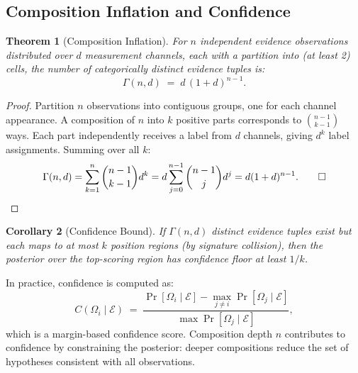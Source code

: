 \documentclass[twocolumn,10pt]{article}
\newtheorem{theorem}{Theorem}[section]
\newtheorem{corollary}[theorem]{Corollary}
\begin{document}
\subsection{Composition Inflation and Confidence}

\begin{theorem}[Composition Inflation]
\label{thm:inflation}
For $n$ independent evidence observations distributed over $d$ measurement
channels, each with a partition into (at least 2) cells, the number of
categorically distinct evidence tuples is:
\begin{equation}
  \Gamma(n, d) \;=\; d\,(1+d)^{n-1}.
  \label{eq:inflation}
\end{equation}
\end{theorem}

\begin{proof}
Partition $n$ observations into contiguous groups, one for each channel
appearance. A composition of $n$ into $k$ positive parts corresponds to
$\binom{n-1}{k-1}$ ways. Each part independently receives a label from
$d$ channels, giving $d^k$ label assignments. Summing over all $k$:
\begin{equation}
  \Gamma(n,d) = \sum_{k=1}^{n} \binom{n-1}{k-1} d^k
  = d \sum_{j=0}^{n-1} \binom{n-1}{j} d^j
  = d(1+d)^{n-1}. \qed
\end{equation}
\end{proof}

\begin{corollary}[Confidence Bound]
\label{cor:conf-bound}
If $\Gamma(n,d)$ distinct evidence tuples exist but each maps to at most
$k$ position regions (by signature collision), then the posterior over
the top-scoring region has confidence floor at least $1/k$.
\end{corollary}

In practice, confidence is computed as:
\begin{equation}
  C(\Omega_i \mid \mathcal{E}) \;=\;
  \frac{\Pr[\Omega_i \mid \mathcal{E}] - \max_{j \neq i} \Pr[\Omega_j \mid \mathcal{E}]}
       {\max \Pr[\Omega_j \mid \mathcal{E}]},
  \label{eq:confidence}
\end{equation}
which is a margin-based confidence score. Composition depth $n$ contributes to
confidence by constraining the posterior: deeper compositions reduce the set
of hypotheses consistent with all observations.
\end{document}

